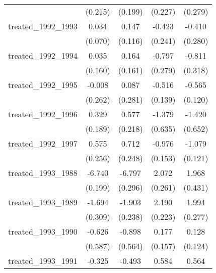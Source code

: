 {\begin{tabular}{l*{4}{c}}
            &     (0.215)         &     (0.199)         &     (0.227)         &     (0.279)         \\
[1em]
treated\_1992\_1993&       0.034         &       0.147         &      -0.423         &      -0.410         \\
            &     (0.070)         &     (0.116)         &     (0.241)         &     (0.280)         \\
[1em]
treated\_1992\_1994&       0.035         &       0.164         &      -0.797\sym{**} &      -0.811\sym{*}  \\
            &     (0.160)         &     (0.161)         &     (0.279)         &     (0.318)         \\
[1em]
treated\_1992\_1995&      -0.008         &       0.087         &      -0.516\sym{***}&      -0.565\sym{***}\\
            &     (0.262)         &     (0.281)         &     (0.139)         &     (0.120)         \\
[1em]
treated\_1992\_1996&       0.329         &       0.577\sym{**} &      -1.379\sym{*}  &      -1.420\sym{*}  \\
            &     (0.189)         &     (0.218)         &     (0.635)         &     (0.652)         \\
[1em]
treated\_1992\_1997&       0.575\sym{*}  &       0.712\sym{**} &      -0.976\sym{***}&      -1.079\sym{***}\\
            &     (0.256)         &     (0.248)         &     (0.153)         &     (0.121)         \\
[1em]
treated\_1993\_1988&      -6.740\sym{***}&      -6.797\sym{***}&       2.072\sym{***}&       1.968\sym{***}\\
            &     (0.199)         &     (0.296)         &     (0.261)         &     (0.431)         \\
[1em]
treated\_1993\_1989&      -1.694\sym{***}&      -1.903\sym{***}&       2.190\sym{***}&       1.994\sym{***}\\
            &     (0.309)         &     (0.238)         &     (0.223)         &     (0.277)         \\
[1em]
treated\_1993\_1990&      -0.626         &      -0.898         &       0.177         &       0.128         \\
            &     (0.587)         &     (0.564)         &     (0.157)         &     (0.124)         \\
[1em]
treated\_1993\_1991&      -0.325         &      -0.493         &       0.584         &       0.564         \\

\end{tabular}}
